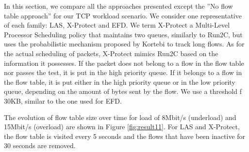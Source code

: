 \documentclass[preprint,12pt]{elsarticle}
\begin{document}
In this section, we compare all the approaches presented except the ''No flow table approach'' for our TCP workload scenario. We consider one representative of each family: LAS, X-Protect and EFD. We term X-Protect a Multi-Level Processor Scheduling policy that maintains two queues, similarly to Run2C, but uses the probabilistic mechanism proposed by Kortebi \cite{Kortebi04Xprotect} to track long flows. As for the actual scheduling of packets, X-Protect mimics Run2C based on the information it possesses. If the packet does not belong to a flow in the flow table nor passes the test, it is put in the high priority queue. If it belongs to a flow in the flow table, it is put either in the high priority queue or in the low priority queue, depending on the amount of bytes sent by the flow. We use a threshold f 30KB, similar to the one used for EFD.



The evolution of  flow table size over time for load of 8Mbit/s (underload) and 15Mbit/s (overload) are shown in Figure \ref{fig:result11}. For LAS and X-Protect, the flow table is visited  every 5 seconds  and the flows that have been inactive for 30 seconds are removed. %
\end{document}
